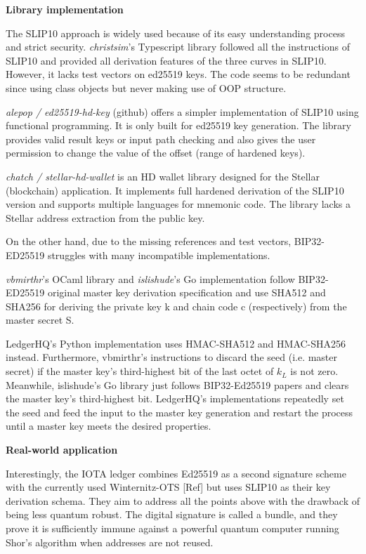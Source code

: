 \bigskip
{\textbf{Library implementation}}

The SLIP10 approach is widely used because of its easy understanding process and strict security. \textit{christsim}'s Typescript library \cite{christsim} followed all the instructions of SLIP10 and provided all derivation features of the three curves in SLIP10. However, it lacks test vectors on ed25519 keys. The code seems to be redundant since using class objects but never making use of OOP structure.

\textit{alepop / ed25519-hd-key} (github) \cite{alepop} offers a simpler implementation of SLIP10 using functional programming. It is only built for ed25519 key generation. The library provides valid result keys or input path checking and also gives the user permission to change the value of the offset (range of hardened keys).

\textit{chatch / stellar-hd-wallet} is an HD wallet library designed for the Stellar (blockchain) application. It implements full hardened derivation of the SLIP10 version and supports multiple languages for mnemonic code. The library lacks a Stellar address extraction from the public key.

On the other hand, due to the missing references and test vectors, BIP32-ED25519 struggles with many incompatible implementations.

\textit{vbmirthr}'s OCaml library \cite{vinc} and \textit{islishude}'s Go implementation \cite{Shude} follow BIP32-ED25519 original master key derivation specification and use SHA512 and SHA256 for deriving the private key k and chain code c (respectively) from the master secret S.

LedgerHQ's Python implementation \cite{LedgerHQ} uses HMAC-SHA512 and HMAC-SHA256 instead.
Furthermore, vbmirthr's instructions to discard the seed (i.e. master secret) if the master key's third-highest bit of the last octet of $k_L$ is not zero. Meanwhile, islishude's Go library just follows BIP32-Ed25519 papers and clears the master key's third-highest bit. LedgerHQ's implementations repeatedly set the seed and feed the input to the master key generation and restart the process until a master key meets the desired properties.


\bigskip
{\textbf{Real-world application}}

Interestingly, the IOTA ledger combines Ed25519 as a second signature scheme with the currently used Winternitz-OTS [Ref] but uses SLIP10 as their key derivation schema.
They aim to address all the points above with the drawback of being less quantum robust. The digital signature is called a bundle, and they prove it is sufficiently immune against a powerful quantum computer running Shor’s algorithm \cite{shor} when addresses are not reused.

